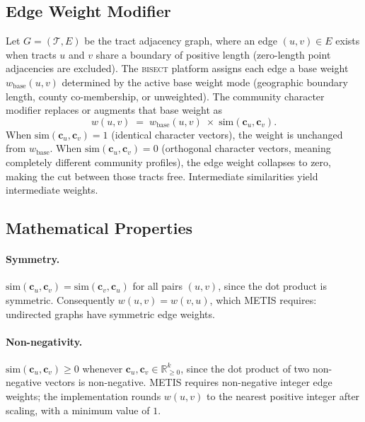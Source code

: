 \subsection{Edge Weight Modifier}

Let $G = (\mathcal{T}, E)$ be the tract adjacency graph, where an edge
$(u,v) \in E$ exists when tracts $u$ and $v$ share a boundary of positive length
(zero-length point adjacencies are excluded).
The \textsc{bisect} platform assigns each edge a base weight $w_{\mathrm{base}}(u,v)$
determined by the active base weight mode (geographic boundary length, county
co-membership, or unweighted).
The community character modifier replaces or augments that base weight as
\begin{equation}
  w(u,v) \;=\; w_{\mathrm{base}}(u,v) \;\times\; \mathrm{sim}(\mathbf{c}_u, \mathbf{c}_v).
  \label{eq:weight-modifier}
\end{equation}
When $\mathrm{sim}(\mathbf{c}_u, \mathbf{c}_v) = 1$ (identical character vectors),
the weight is unchanged from $w_{\mathrm{base}}$.
When $\mathrm{sim}(\mathbf{c}_u, \mathbf{c}_v) = 0$ (orthogonal character vectors,
meaning completely different community profiles), the edge weight collapses to zero,
making the cut between those tracts free.
Intermediate similarities yield intermediate weights.

\subsection{Mathematical Properties}

\paragraph{Symmetry.}
$\mathrm{sim}(\mathbf{c}_u, \mathbf{c}_v) = \mathrm{sim}(\mathbf{c}_v, \mathbf{c}_u)$
for all pairs $(u,v)$, since the dot product is symmetric.
Consequently $w(u,v) = w(v,u)$, which METIS requires: undirected graphs have
symmetric edge weights.

\paragraph{Non-negativity.}
$\mathrm{sim}(\mathbf{c}_u, \mathbf{c}_v) \geq 0$ whenever
$\mathbf{c}_u, \mathbf{c}_v \in \mathbb{R}^k_{\geq 0}$, since the dot product of
two non-negative vectors is non-negative.
METIS requires non-negative integer edge weights; the implementation rounds
$w(u,v)$ to the nearest positive integer after scaling, with a minimum value of $1$.

